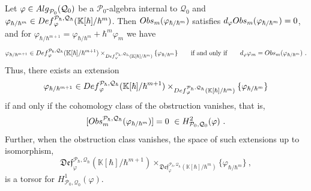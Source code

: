 \documentclass[10pt,a4paper]{amsart}
\newcommand{\Alg}{{\textup{Alg}}}
\newcommand{\Def}{{\textup{Def}}}
\newcommand{\K}{{\bb K}}
\newcommand{\Obs}{{\textup{Obs}}}
\newcommand{\Ph}{{\mathcal{P}_\hbar}}
\newcommand{\Qh}{{\mathcal{Q}_\hbar}}
\newcommand{\bb}{\mathbb}
\newcommand{\fDef}{{\mathfrak{Def}}}
\newcommand{\mc}{\mathcal}
\begin{document}
\begin{theo}\label{DefObsThm} Let $\varphi\in \Alg_{\mc P_0}(\mc Q_0)$ be a $\mc P_0$-algebra internal to $\mc Q_0$ and $\varphi_{\hbar/\hbar^{m}}\in \Def^{\Ph,\Qh}_\varphi(\K[\hbar]/\hbar^{m}) $. Then $\Obs_m(\varphi_{\hbar/\hbar^{m}})$ satisfies $d_\varphi \Obs_m(\varphi_{\hbar/\hbar^{m}})=0$, and for  $\varphi_{ \hbar/ \hbar^{m+1}} =  \varphi_{\hbar/\hbar^{m}} + \hbar^m \varphi_m $ we have
		\[ \varphi_{ \hbar/ \hbar^{m+1}} \in \Def^{\Ph,\Qh}_\varphi(\K[\hbar]/\hbar^{m+1}) \times_{\Def^{\Ph,\Qh}_\varphi(\K[\hbar]/\hbar^{m}) } \{\varphi_{\hbar/\hbar^{m}} \} \qquad \text{if and only if} \qquad d_{\varphi} \varphi_m  = \Obs_m(\varphi_{\hbar/\hbar^{m}}) \ . \]
		Thus, there exists an extension
\[  \varphi_{ \hbar/ \hbar^{m+1}} \in \Def^{\Ph,\Qh}_\varphi(\K[\hbar]/\hbar^{m+1}) \times_{\Def^{\Ph,\Qh}_\varphi(\K[\hbar]/\hbar^{m}) } \{\varphi_{\hbar/\hbar^{m}} \} \]
if and only if the cohomology class of the obstruction vanishes, that is,
\[ [ \Obs^{\Ph,\Qh}_m(\varphi_{\hbar/\hbar^{m}})]= 0 \ \in H^{2}_{\mc P_0,\mc Q_0}(\varphi) \ .\]
Further, when the obstruction class vanishes, the space of such extensions up to isomorphism,
\[  \fDef^{\Ph,\Qh}_\varphi(\K[\hbar]/\hbar^{m+1}) \times_{\fDef^{\Ph,\Qh}_\varphi(\K[\hbar]/\hbar^{m}) } \{\varphi_{\hbar/\hbar^{m}} \} \ , \]
is a torsor for $H^{1}_{\mc P_0,\mc Q_0}(\varphi)$.
\end{theo}
\end{document}
